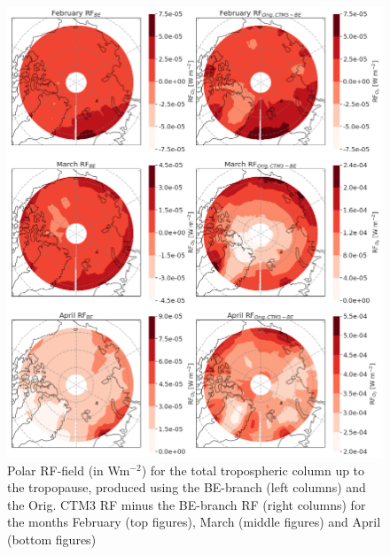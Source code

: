 \begin{figure}[ht]
    \centering
    \includegraphics[width = \linewidth]{Chapter6_Results/images/RF/BEOrig_RF_polar_FebApr_2001.png}
    \caption{Polar RF-field (in Wm$^{-2}$) for the total tropospheric column up to the tropopause, produced using the BE-branch (left columns) and the Orig. CTM3 RF minus the BE-branch RF (right columns) for the months February (top figures), March (middle figures) and April (bottom figures)}
    \label{fig:BEorig_RF_global_FebApr_2001}
\end{figure}